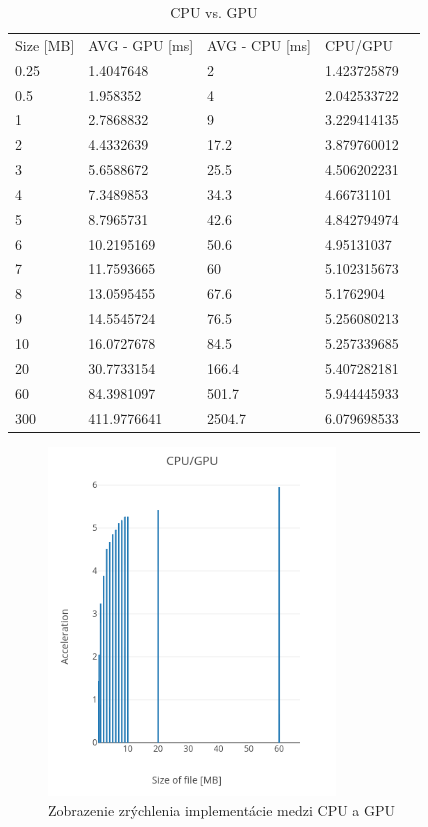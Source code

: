 \documentclass[conference]{IEEEtran}
\begin{document}
\begin{table}[h!]
\centering
\caption{CPU vs. GPU}
\label{table}
\begin{tabular}{lllll}
Size {[}MB{]} & AVG - GPU {[}ms{]} & AVG - CPU {[}ms{]} & CPU/GPU     &  \\
0.25          & 1.4047648          & 2                  & 1.423725879 &  \\
0.5           & 1.958352           & 4                  & 2.042533722 &  \\
1             & 2.7868832          & 9                  & 3.229414135 &  \\
2             & 4.4332639          & 17.2               & 3.879760012 &  \\
3             & 5.6588672          & 25.5               & 4.506202231 &  \\
4             & 7.3489853          & 34.3               & 4.66731101  &  \\
5             & 8.7965731          & 42.6               & 4.842794974 &  \\
6             & 10.2195169         & 50.6               & 4.95131037  &  \\
7             & 11.7593665         & 60                 & 5.102315673 &  \\
8             & 13.0595455         & 67.6               & 5.1762904   &  \\
9             & 14.5545724         & 76.5               & 5.256080213 &  \\
10            & 16.0727678         & 84.5               & 5.257339685 &  \\
20            & 30.7733154         & 166.4              & 5.407282181 &  \\
60            & 84.3981097         & 501.7              & 5.944445933 &  \\
300           & 411.9776641        & 2504.7             & 6.079698533 & 
\end{tabular}
\end{table}


\begin{figure}[h!]
\centering
\includegraphics[width=3in]{img/acceleration}
\caption{Zobrazenie zrýchlenia implementácie medzi CPU a GPU}
\end{figure}
\end{document}
